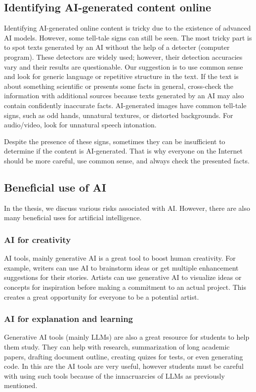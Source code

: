 \subsection*{Identifying AI-generated content online}
Identifying AI-generated online content is tricky due to the existence of advanced AI models. However, some tell-tale signs can still be seen. The most tricky part is to spot texts generated by an AI without the help of a detecter (computer program). These detectors are widely used; however, their detection accuracies vary and their results are questionable. Our suggestion is to use common sense and look for generic language or repetitive structure in the text. If the text is about something scientific or presents some facts in general, cross-check the information with additional sources because texts generated by an AI may also contain confidently inaccurate facts. AI-generated images have common tell-tale signs, such as odd hands, unnatural textures, or distorted backgrounds. For audio/video, look for unnatural speech intonation.

Despite the presence of these signs, sometimes they can be insufficient to determine if the content is AI-generated. That is why everyone on the Internet should be more careful, use common sense, and always check the presented facts.

\subsection*{Beneficial use of AI}
In the thesis, we discuss various risks associated with AI. However, there are also many beneficial uses for artificial intelligence.

\subsubsection*{AI for creativity}
AI tools, mainly generative AI is a great tool to boost human creativity. For example, writers can use AI to brainstorm ideas or get multiple enhancement suggestions for their stories. Artists can use generative AI to visualize ideas or concepts for inspiration before making a commitment to an actual project. This creates a great opportunity for everyone to be a potential artist.

\subsubsection*{AI for explanation and learning}
Generative AI tools (mainly LLMs) are also a great resource for students to help them study. They can help with research, summarization of long academic papers, drafting document outline, creating quizes for tests, or even generating code. In this are the AI tools are very useful, however students must be careful with using such tools because of the innacruarcies of LLMs as previously mentioned.


